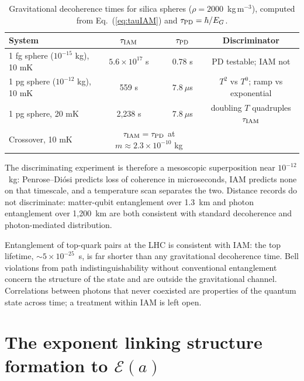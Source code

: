 \documentclass[12pt,a4paper]{article}
\begin{document}
\begin{table}[h]
\centering
\small
\caption{Gravitational decoherence times for silica spheres
($\rho=2000$~kg\,m$^{-3}$), computed from Eq.~(\ref{eq:tauIAM}) and
$\tau_{\rm PD}=\hbar/E_G$.}
\label{tab:decoherence}
\begin{tabular}{lccc}
\toprule
System & $\tau_{\rm IAM}$ & $\tau_{\rm PD}$ & Discriminator \\
\midrule
1 fg sphere ($10^{-15}$ kg), 10 mK & $5.6\times10^{17}$ s & 0.78 s & PD testable; IAM not \\
1 pg sphere ($10^{-12}$ kg), 10 mK & 559 s & $7.8~\mu$s & $T^2$ vs $T^0$; ramp vs exponential \\
1 pg sphere, 20 mK & 2,238 s & $7.8~\mu$s & doubling $T$ quadruples $\tau_{\rm IAM}$ \\
Crossover, 10 mK & \multicolumn{2}{c}{$\tau_{\rm IAM}=\tau_{\rm PD}$ at $m\approx2.3\times10^{-10}$ kg} & \\
\bottomrule
\end{tabular}
\end{table}

The discriminating experiment is therefore a mesoscopic superposition near
$10^{-12}$~kg: Penrose--Di\'osi predicts loss of coherence in microseconds, IAM
predicts none on that timescale, and a temperature scan separates the two. Distance
records do not discriminate: matter-qubit entanglement over 1.3~km
\citep{Hensen2015} and photon entanglement over 1,200~km \citep{Yin2017} are both
consistent with standard decoherence and photon-mediated distribution.

Entanglement of top-quark pairs at the LHC \citep{CMS2024} is consistent with IAM:
the top lifetime, $\sim5\times10^{-25}$~s, is far shorter than any gravitational
decoherence time. Bell violations from path indistinguishability without
conventional entanglement \citep{SciAdv2025} concern the structure of the state and
are outside the gravitational channel. Correlations between photons that never
coexisted \citep{Megidish2013} are properties of the quantum state across time; a
treatment within IAM is left open.

\section{The exponent linking structure formation to $\mathcal{E}(a)$}
\label{sec:exponent}
\end{document}
